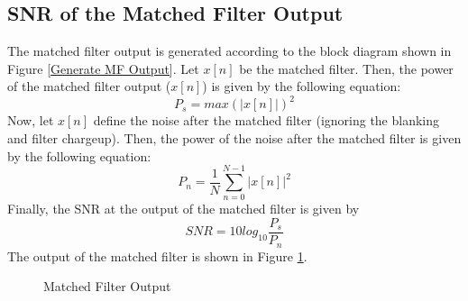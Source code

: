 \documentclass[12pt,letterpaper]{article}
\begin{document}
\subsection{SNR of the Matched Filter Output}
The matched filter output is generated according to the block diagram shown in Figure \ref{Generate MF Output}. Let $x[n]$ be the matched filter. Then, the power of the matched filter output ($x[n]$) is given by the following equation:
\begin{equation}
P_s = max(|x[n]|)^2
\end{equation}
Now, let $x[n]$ define the noise after the matched filter (ignoring the blanking and filter chargeup). Then, the power of the noise after the matched filter is given by the following equation:
\begin{equation}
P_n = \frac{1}{N}\sum_{n=0}^{N-1}|x[n]|^2
\end{equation}
Finally, the SNR at the output of the matched filter is given by
\begin{equation}
SNR = 10log_{10}\frac{P_s}{P_n}
\end{equation}
The output of the matched filter is shown in Figure \ref{MF Output}.
\begin{figure}[H]
\caption{Matched Filter Output}
\label{MF Output}
\end{figure}
\end{document}
